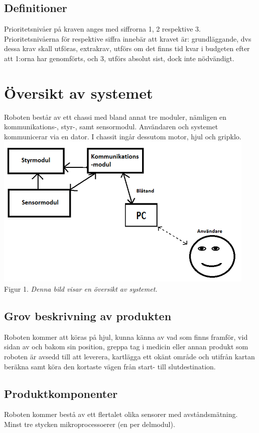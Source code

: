 \documentclass[11pt]{article}
\begin{document}
\begin{flushleft}
\subsection{Definitioner}
Prioritetsnivåer på kraven anges med siffrorna 1, 2 respektive 3. Prioritetsnivåerna för respektive siffra innebär att kravet är: grundläggande, dvs dessa krav skall utföras, extrakrav, utförs om det finns tid kvar i budgeten efter att 1:orna har genomförts, och 3, utförs absolut sist, dock inte nödvändigt.

\pagebreak

\section{Översikt av systemet}
Roboten består av ett chassi med bland annat tre moduler, nämligen en kommunikations-, styr-, samt sensormodul. Användaren och systemet kommunicerar via en dator. I chassit ingår dessutom motor, hjul och gripklo.
\includegraphics{systemskiss}
\\
Figur 1. \textit{Denna bild visar en översikt av systemet.}

\subsection{Grov beskrivning av produkten}
Roboten kommer att köras på hjul, kunna känna av vad som finns framför, vid sidan av och bakom sin position, greppa tag i medicin eller annan produkt som roboten är avsedd till att leverera, kartlägga ett okänt område och utifrån kartan beräkna samt köra den kortaste vägen från start- till slutdestination. 

\subsection{Produktkomponenter}
Roboten kommer bestå av ett flertalet olika sensorer med avståndsmätning. Minst tre stycken mikroprocessoerer (en per delmodul). 


\end{flushleft}
\end{document}
